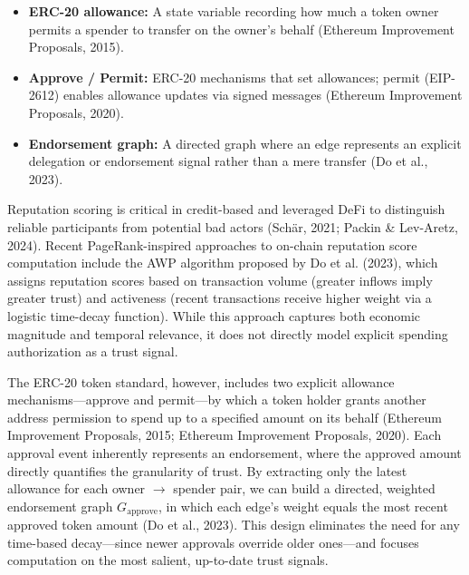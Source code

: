 \begin{itemize}
\item[\textbullet] \textbf{ERC-20 allowance: }A state variable recording how much a token owner permits a spender to transfer on the owner's behalf (Ethereum Improvement Proposals, 2015).
\item[\textbullet] \textbf{Approve / Permit: }ERC-20 mechanisms that set allowances; permit (EIP-2612) enables allowance updates via signed messages (Ethereum Improvement Proposals, 2020).
\item[\textbullet] \textbf{Endorsement graph: }A directed graph where an edge represents an explicit delegation or endorsement signal rather than a mere transfer (Do et al., 2023).
\end{itemize}
Reputation scoring is critical in credit-based and leveraged DeFi to distinguish reliable participants from potential bad actors (Sch\"{a}r, 2021; Packin \& Lev-Aretz, 2024). Recent PageRank-inspired approaches to on-chain reputation score computation include the AWP algorithm proposed by Do et al. (2023), which assigns reputation scores based on transaction volume (greater inflows imply greater trust) and activeness (recent transactions receive higher weight via a logistic time-decay function). While this approach captures both economic magnitude and temporal relevance, it does not directly model explicit spending authorization as a trust signal.


The ERC-20 token standard, however, includes two explicit allowance mechanisms---approve and permit---by which a token holder grants another address permission to spend up to a specified amount on its behalf (Ethereum Improvement Proposals, 2015; Ethereum Improvement Proposals, 2020). Each approval event inherently represents an endorsement, where the approved amount directly quantifies the granularity of trust. By extracting only the latest allowance for each owner \(\to\) spender pair, we can build a directed, weighted endorsement graph $G_{\text{approve}}$, in which each edge's weight equals the most recent approved token amount (Do et al., 2023). This design eliminates the need for any time-based decay---since newer approvals override older ones---and focuses computation on the most salient, up-to-date trust signals.


